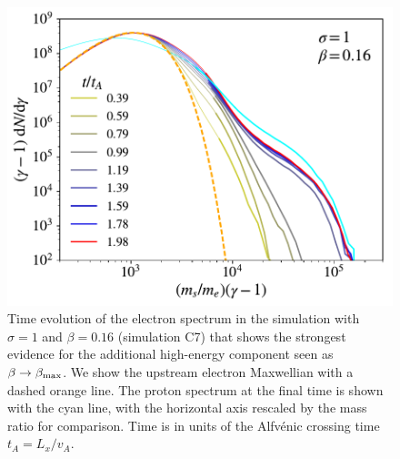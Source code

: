  

\begin{figure}[!h]
\centering
\includegraphics[width =\textwidth]{sig1_delgam_2_timespec.pdf}
\caption{Time evolution of the electron spectrum in the simulation with $\sigma=1$ and $\beta=0.16$ (simulation C7) that shows the strongest evidence for the additional high-energy component seen as $\beta\rightarrow\beta_{\rm max}$. We show the upstream electron Maxwellian with a dashed orange line. The proton spectrum at the final time is shown with the cyan line, with the horizontal axis rescaled by the mass ratio for comparison. Time is in units of the Alfv\'enic crossing time $t_A=L_x/v_A$.}
\label{sig1_timespec}
\end{figure}









